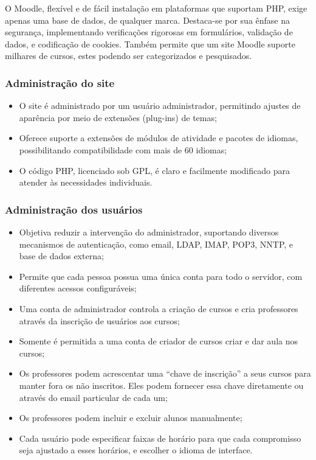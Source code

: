 O Moodle, flexível e de fácil instalação em plataformas que suportam PHP, exige apenas uma base de dados, de qualquer marca. Destaca-se por sua ênfase na segurança, implementando verificações rigorosas em formulários, validação de dados, e codificação de cookies. Também permite que um site Moodle suporte milhares de cursos, estes podendo ser categorizados e pesquisados.

\subsubsection{Administração do site}

\begin{itemize}
    \item O site é administrado por um usuário administrador, permitindo ajustes de aparência por meio de extensões (plug-ins) de temas;
    \item Oferece suporte a extensões de módulos de atividade e pacotes de idiomas, possibilitando compatibilidade com mais de 60 idiomas; 
    \item O código PHP, licenciado sob GPL, é claro e facilmente modificado para atender às necessidades individuais.
\end{itemize}

\subsubsection{Administração dos usuários}

\begin{itemize}
    \item Objetiva reduzir a intervenção do administrador, suportando diversos mecanismos de autenticação, como email, LDAP, IMAP, POP3, NNTP, e base de dados externa;
    \item Permite que cada pessoa possua uma única conta para todo o servidor, com diferentes acessos configuráveis; 
    \item Uma conta de administrador controla a criação de cursos e cria professores através da inscrição de usuários aos cursos;
    \item Somente é permitida a uma conta de criador de cursos criar e dar aula nos cursos;
    \item Os professores podem acrescentar uma “chave de inscrição” a seus cursos para manter fora os não inscritos. Eles podem fornecer essa chave diretamente ou através do email particular de cada um;
    \item Os professores podem incluir e excluir alunos manualmente;
    \item Cada usuário pode especificar faixas de horário para que cada compromisso seja ajustado a esses horários, e escolher o idioma de interface.
\end{itemize}

